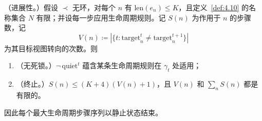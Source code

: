 \begin{theorem}\label{thm:4.5}
（进展性。）假设 $\prec$ 无环，对每个 $n$ 有 $\mathrm{len}(e_n) \leqslant K$，且定义~\ref{def:4.10} 的名称集合 $N$ 有限；并设每一步应用生命周期规则。记 $S(n)$ 为作用于 $n$ 的步骤数，记
\begin{equation}\label{eq:4.30}
V(n) \coloneqq |\{t: \mathrm{target}^t_n \neq \mathrm{target}^{t+1}_n\}|
\end{equation}
为其目标视图转向的次数。则
\begin{enumerate}
\item （无死锁。）$\lnot\,\mathrm{quiet}^t$ 蕴含某条生命周期规则在 $\gamma_t$ 处适用；
\item （终止。）$S(n) \leqslant (K + 4)(V(n) + 1)$，且 $V(n)$ 和 $\sum_n S(n)$ 都是有限的。
\end{enumerate}
因此每个最大生命周期步骤序列以静止状态结束。
\end{theorem}

